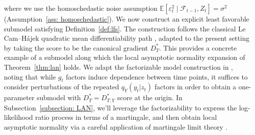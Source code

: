 \documentclass[11pt]{article}
\begin{document}
where we use the homoschedastic noise assumption $\mathbb{E}[\varepsilon_t^2 \mid \mathcal{F}_{t-1}, Z_t] = \sigma^2$ (Assumption~\ref{ass: homoschedastic}). We now construct an explicit least favorable submodel satisfying Definition~\ref{def:lfs}. The construction follows the classical Le Cam--H{\'a}jek quadratic mean differentiability path \citep{lecam1986asymptotic}, adapted to the present setting by taking the score to be the canonical gradient $D_T^*$. This provides a concrete example of a submodel along which the local asymptotic normality expansion of Theorem~\ref{thm:lan} holds. We adapt the factorizable model construction in \citet[Lemma 17]{vanderlaan2026nonparametricinstrumentalvariableinference}, noting that while $g_t$ factors induce dependence between time points, it suffices to consider perturbations of the repeated $q_Y(y_t|z_t)$ factors in order to obtain a one-parameter submodel with $D_T^{\ast} = D_{T,Y}^{\ast}$ score at the origin. In Subsection~\ref{subsection: LAN}, we'll leverage the factorizability to express the log-likelihood ratio process in terms of a martingale, and then obtain local asymptotic normality via a careful application of martingale limit theory \citep{hall1980}. 
\end{document}
